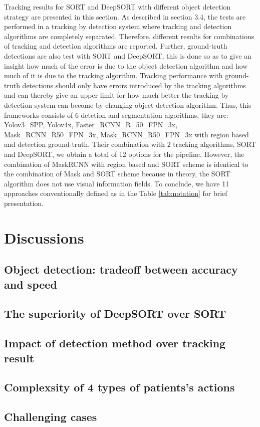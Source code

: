 Tracking results for SORT and DeepSORT with different object detection strategy are presented in this section. As described in section 3.4, the tests are performed in a tracking by detection system where tracking and detection algorithms are completely separated. Therefore, different results for combinations of tracking and detection algorithms are reported. Further, ground-truth detections are also test with SORT and DeepSORT, this is done so as to give an insight how much of the error is due to the object detection algorithm and how much of it is due to the tracking algorithm. Tracking performance with ground-truth detections should only have errors introduced by the tracking algorithms and can thereby give an upper limit for how much better the tracking by detection system can become by changing object detection algorithm. Thus, this frameworks consists of 6 detction and segmentation algorithms, they are: Yolov3\_SPP, Yolov4x, Faster\_RCNN\_R\_50\_FPN\_3x, Mask\_RCNN\_R50\_FPN\_3x, Mask\_RCNN\_R50\_FPN\_3x with region based and detection ground-truth. Their combination with 2 tracking algorithms, SORT and DeepSORT, we obtain a total of 12 options for the pipeline. However, the combination of MaskRCNN with region based and SORT scheme is identical to the combination of Mask and SORT scheme because in theory, the SORT algorithm does not use visual information fields. To conclude, we have 11 approaches conventionally defined as in the Table \ref{tab:notation} for brief presentation.

\section{Discussions}
\subsection{Object detection: tradeoff between accuracy and speed}
\subsection{The superiority of DeepSORT over SORT}
\subsection{Impact of detection method over tracking result}
\subsection{Complexsity of 4 types of patients's actions}
\subsection{Challenging cases}